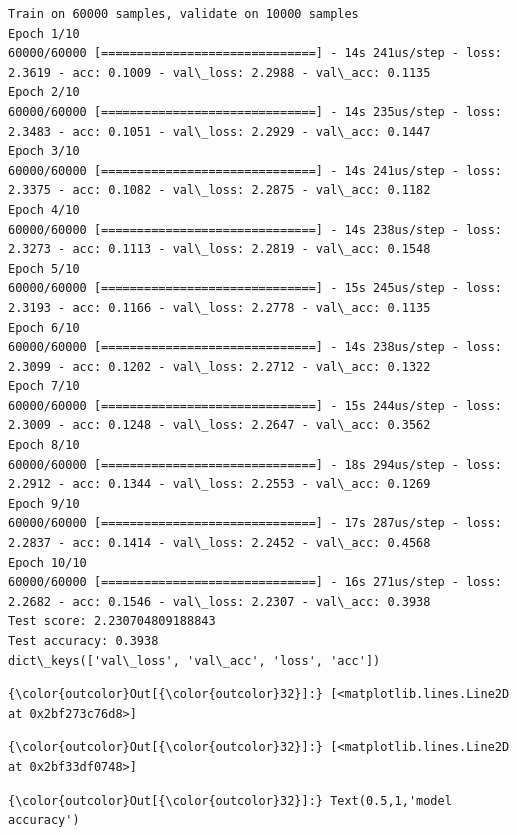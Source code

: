 \documentclass[11pt]{article}
\begin{document}
    \begin{Verbatim}[commandchars=\\\{\}]
Train on 60000 samples, validate on 10000 samples
Epoch 1/10
60000/60000 [==============================] - 14s 241us/step - loss: 2.3619 - acc: 0.1009 - val\_loss: 2.2988 - val\_acc: 0.1135
Epoch 2/10
60000/60000 [==============================] - 14s 235us/step - loss: 2.3483 - acc: 0.1051 - val\_loss: 2.2929 - val\_acc: 0.1447
Epoch 3/10
60000/60000 [==============================] - 14s 241us/step - loss: 2.3375 - acc: 0.1082 - val\_loss: 2.2875 - val\_acc: 0.1182
Epoch 4/10
60000/60000 [==============================] - 14s 238us/step - loss: 2.3273 - acc: 0.1113 - val\_loss: 2.2819 - val\_acc: 0.1548
Epoch 5/10
60000/60000 [==============================] - 15s 245us/step - loss: 2.3193 - acc: 0.1166 - val\_loss: 2.2778 - val\_acc: 0.1135
Epoch 6/10
60000/60000 [==============================] - 14s 238us/step - loss: 2.3099 - acc: 0.1202 - val\_loss: 2.2712 - val\_acc: 0.1322
Epoch 7/10
60000/60000 [==============================] - 15s 244us/step - loss: 2.3009 - acc: 0.1248 - val\_loss: 2.2647 - val\_acc: 0.3562
Epoch 8/10
60000/60000 [==============================] - 18s 294us/step - loss: 2.2912 - acc: 0.1344 - val\_loss: 2.2553 - val\_acc: 0.1269
Epoch 9/10
60000/60000 [==============================] - 17s 287us/step - loss: 2.2837 - acc: 0.1414 - val\_loss: 2.2452 - val\_acc: 0.4568
Epoch 10/10
60000/60000 [==============================] - 16s 271us/step - loss: 2.2682 - acc: 0.1546 - val\_loss: 2.2307 - val\_acc: 0.3938
Test score: 2.230704809188843
Test accuracy: 0.3938
dict\_keys(['val\_loss', 'val\_acc', 'loss', 'acc'])

    \end{Verbatim}

\begin{Verbatim}[commandchars=\\\{\}]
{\color{outcolor}Out[{\color{outcolor}32}]:} [<matplotlib.lines.Line2D at 0x2bf273c76d8>]
\end{Verbatim}
            
\begin{Verbatim}[commandchars=\\\{\}]
{\color{outcolor}Out[{\color{outcolor}32}]:} [<matplotlib.lines.Line2D at 0x2bf33df0748>]
\end{Verbatim}
            
\begin{Verbatim}[commandchars=\\\{\}]
{\color{outcolor}Out[{\color{outcolor}32}]:} Text(0.5,1,'model accuracy')
\end{Verbatim}
            
\end{document}
